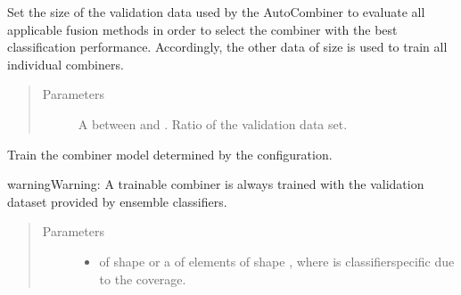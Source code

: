 \documentclass[letterpaper,10pt,english]{sphinxmanual}
\begin{document}
\begin{fulllineitems}
\begin{fulllineitems}
\label{\detokenize{pusion.control.decision_processor:pusion.control.decision_processor.DecisionProcessor.set_data_split_ratio}}
\sphinxAtStartPar
Set the size of the validation data used by the AutoCombiner to evaluate all applicable fusion methods in order
to select the combiner with the best classification performance.
Accordingly, the other data of size  is used to train all individual combiners.
\begin{quote}\begin{description}
\item[{Parameters}] \leavevmode
\sphinxAtStartPar
{} \textendash{} A  between  and . Ratio of the validation data set.

\end{description}\end{quote}

\end{fulllineitems}


\begin{fulllineitems}
\label{\detokenize{pusion.control.decision_processor:pusion.control.decision_processor.DecisionProcessor.train}}
\sphinxAtStartPar
Train the combiner model determined by the configuration.

\begin{sphinxadmonition}{warning}{Warning:}
\sphinxAtStartPar
A trainable combiner is always trained with the validation dataset provided by ensemble classifiers.
\end{sphinxadmonition}
\begin{quote}\begin{description}
\item[{Parameters}] \leavevmode\begin{itemize}
\item {} 
\sphinxAtStartPar
{} \textendash{} 
\sphinxAtStartPar
{} of shape  or a  of
 elements of shape , where  is classifier\sphinxhyphen{}specific
due to the coverage.


\end{itemize}
\end{description}
\end{quote}
\end{fulllineitems}
\end{fulllineitems}
\end{document}
